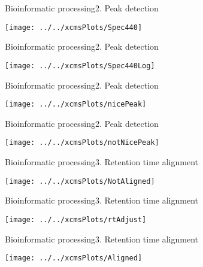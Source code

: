 \documentclass[xcolor=dvipsnames]{beamer}
\begin{document}
\begin{frame}{Bioinformatic processing}{2. Peak detection}
\vspace{-10pt}
\begin{center}
	\texttt{[image: ../../xcmsPlots/Spec440]}
\end{center}
\end{frame}

\begin{frame}{Bioinformatic processing}{2. Peak detection}
\vspace{-10pt}
\begin{center}
	\texttt{[image: ../../xcmsPlots/Spec440Log]}
\end{center}
\end{frame}

\begin{frame}{Bioinformatic processing}{2. Peak detection}
\vspace{-10pt}
\begin{center}
	\texttt{[image: ../../xcmsPlots/nicePeak]}
\end{center}
\end{frame}

\begin{frame}{Bioinformatic processing}{2. Peak detection}
\vspace{-10pt}
\begin{center}
	\texttt{[image: ../../xcmsPlots/notNicePeak]}
\end{center}
\end{frame}

\begin{frame}{Bioinformatic processing}{3. Retention time alignment}
\vspace{-10pt}
\begin{center}
	\texttt{[image: ../../xcmsPlots/NotAligned]}
\end{center}
\end{frame}

\begin{frame}{Bioinformatic processing}{3. Retention time alignment}
\vspace{-10pt}
\begin{center}
\texttt{[image: ../../xcmsPlots/rtAdjust]}
\end{center}
\end{frame}

\begin{frame}{Bioinformatic processing}{3. Retention time alignment}
\vspace{-10pt}
\begin{center}
	\texttt{[image: ../../xcmsPlots/Aligned]}
\end{center}
\end{frame}
\end{document}
